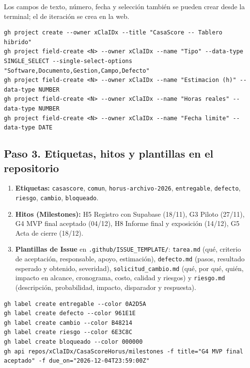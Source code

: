 \documentclass[11pt,a4paper]{article}
\begin{document}
\vspace{0.1cm}
\noindent Los campos de texto, número, fecha y selección también se pueden crear desde la terminal; el de iteración se crea en la web.

\begin{lstlisting}
gh project create --owner xClaIDx --title "CasaScore -- Tablero hibrido"
gh project field-create <N> --owner xClaIDx --name "Tipo" --data-type SINGLE_SELECT --single-select-options "Software,Documento,Gestion,Campo,Defecto"
gh project field-create <N> --owner xClaIDx --name "Estimacion (h)" --data-type NUMBER
gh project field-create <N> --owner xClaIDx --name "Horas reales" --data-type NUMBER
gh project field-create <N> --owner xClaIDx --name "Fecha limite" --data-type DATE
\end{lstlisting}

\subsection{Paso 3. Etiquetas, hitos y plantillas en el repositorio}
\begin{enumerate}[leftmargin=*]
    \item \textbf{Etiquetas:} \texttt{casascore}, \texttt{comun}, \texttt{horus-archivo-2026}, \texttt{entregable}, \texttt{defecto}, \texttt{riesgo}, \texttt{cambio}, \texttt{bloqueado}.
    \item \textbf{Hitos (Milestones):} H5 Registro con Supabase (18/11), G3 Piloto (27/11), G4 MVP final aceptado (04/12), H8 Informe final y exposición (14/12), G5 Acta de cierre (18/12).
    \item \textbf{Plantillas de Issue} en \texttt{.github/ISSUE\_TEMPLATE/}: \texttt{tarea.md} (qué, criterio de aceptación, responsable, apoyo, estimación), \texttt{defecto.md} (pasos, resultado esperado y obtenido, severidad), \texttt{solicitud\_cambio.md} (qué, por qué, quién, impacto en alcance, cronograma, costo, calidad y riesgos) y \texttt{riesgo.md} (descripción, probabilidad, impacto, disparador y respuesta).
\end{enumerate}

\begin{lstlisting}
gh label create entregable --color 0A2D5A
gh label create defecto --color 961E1E
gh label create cambio --color B48214
gh label create riesgo --color 6E3C8C
gh label create bloqueado --color 000000
gh api repos/xClaIDx/CasaScoreHorus/milestones -f title="G4 MVP final aceptado" -f due_on="2026-12-04T23:59:00Z"
\end{lstlisting}
\end{document}
